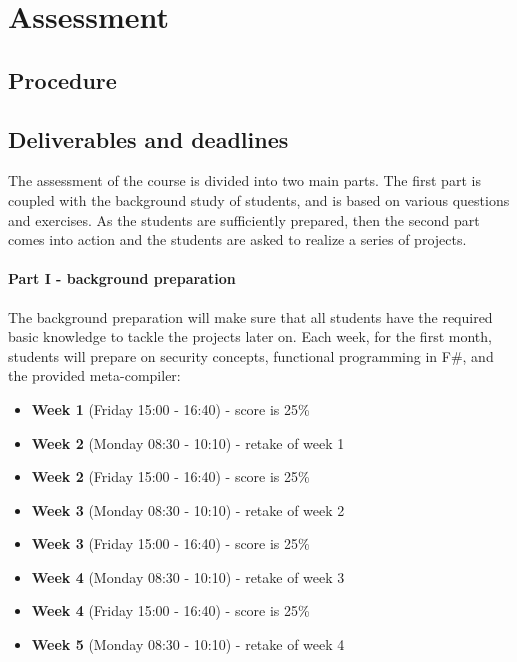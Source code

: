 \section{Assessment}
	\subsection{Procedure}

	\subsection{Deliverables and deadlines}
		The assessment of the course is divided into two main parts. The first part is coupled with the background study of students, and is based on various questions and exercises. As the students are sufficiently prepared, then the second part comes into action and the students are asked to realize a series of projects.
		
		\paragraph*{Part I - background preparation}
			The background preparation will make sure that all students have the required basic knowledge to tackle the projects later on. Each week, for the first month, students will prepare on security concepts, functional programming in F\#, and the provided meta-compiler:

			\begin{itemize}
				\item \textbf{Week 1} (Friday 15:00 - 16:40) - score is 25\%
				\item \textbf{Week 2} (Monday 08:30 - 10:10) - retake of week 1

				\item \textbf{Week 2} (Friday 15:00 - 16:40) - score is 25\%
				\item \textbf{Week 3} (Monday 08:30 - 10:10) - retake of week 2

				\item \textbf{Week 3} (Friday 15:00 - 16:40) - score is 25\%
				\item \textbf{Week 4} (Monday 08:30 - 10:10) - retake of week 3

				\item \textbf{Week 4} (Friday 15:00 - 16:40) - score is 25\%
				\item \textbf{Week 5} (Monday 08:30 - 10:10) - retake of week 4

			\end{itemize}						


